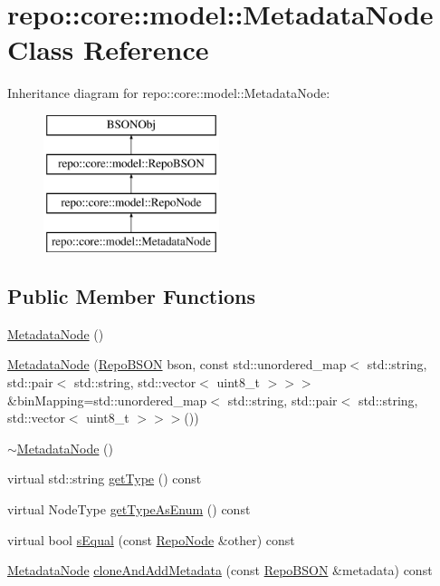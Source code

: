 \hypertarget{classrepo_1_1core_1_1model_1_1_metadata_node}{}\section{repo\+:\+:core\+:\+:model\+:\+:Metadata\+Node Class Reference}
\label{classrepo_1_1core_1_1model_1_1_metadata_node}
Inheritance diagram for repo\+:\+:core\+:\+:model\+:\+:Metadata\+Node\+:\begin{figure}[H]
\begin{center}
\leavevmode
\includegraphics[height=4.000000cm]{classrepo_1_1core_1_1model_1_1_metadata_node}
\end{center}
\end{figure}
\subsection*{Public Member Functions}
\begin{DoxyCompactItemize}
\item 
\hyperlink{classrepo_1_1core_1_1model_1_1_metadata_node_aa5d417f51255811df8a73b2f36edf740}{Metadata\+Node} ()
\item 
\hyperlink{classrepo_1_1core_1_1model_1_1_metadata_node_ad2aca9c43d363cd7a093b5f495b84eef}{Metadata\+Node} (\hyperlink{classrepo_1_1core_1_1model_1_1_repo_b_s_o_n}{Repo\+B\+S\+O\+N} bson, const std\+::unordered\+\_\+map$<$ std\+::string, std\+::pair$<$ std\+::string, std\+::vector$<$ uint8\+\_\+t $>$$>$$>$ \&bin\+Mapping=std\+::unordered\+\_\+map$<$ std\+::string, std\+::pair$<$ std\+::string, std\+::vector$<$ uint8\+\_\+t $>$$>$$>$())
\item 
\hyperlink{classrepo_1_1core_1_1model_1_1_metadata_node_a1d1a2aed0440bee09ab89d5ada8c77cb}{$\sim$\+Metadata\+Node} ()
\item 
virtual std\+::string \hyperlink{classrepo_1_1core_1_1model_1_1_metadata_node_aad51dc79d63495aa6b4b8fd02307786f}{get\+Type} () const 
\item 
virtual Node\+Type \hyperlink{classrepo_1_1core_1_1model_1_1_metadata_node_abc913943e7ce90649aa0d94ef70552ce}{get\+Type\+As\+Enum} () const 
\item 
virtual bool \hyperlink{classrepo_1_1core_1_1model_1_1_metadata_node_a1fd8134ef9585578597b4a8145aebe1d}{s\+Equal} (const \hyperlink{classrepo_1_1core_1_1model_1_1_repo_node}{Repo\+Node} \&other) const 
\item 
\hyperlink{classrepo_1_1core_1_1model_1_1_metadata_node}{Metadata\+Node} \hyperlink{classrepo_1_1core_1_1model_1_1_metadata_node_a515371ea57dc37e9917025d57af9a0f9}{clone\+And\+Add\+Metadata} (const \hyperlink{classrepo_1_1core_1_1model_1_1_repo_b_s_o_n}{Repo\+B\+S\+O\+N} \&metadata) const 
\end{DoxyCompactItemize}

